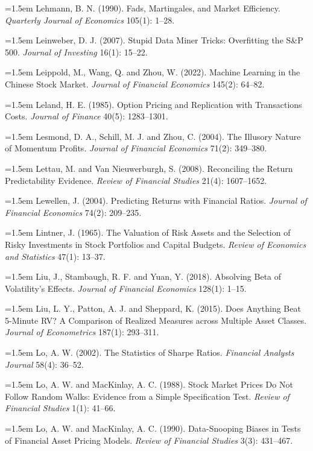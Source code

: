 \hangindent=1.5em Lehmann, B. N. (1990). Fads, Martingales, and Market Efficiency. \emph{Quarterly Journal of Economics} 105(1): 1--28.

\hangindent=1.5em Leinweber, D. J. (2007). Stupid Data Miner Tricks: Overfitting the S\&P 500. \emph{Journal of Investing} 16(1): 15--22.

\hangindent=1.5em Leippold, M., Wang, Q. and Zhou, W. (2022). Machine Learning in the Chinese Stock Market. \emph{Journal of Financial Economics} 145(2): 64--82.

\hangindent=1.5em Leland, H. E. (1985). Option Pricing and Replication with Transactions Costs. \emph{Journal of Finance} 40(5): 1283--1301.

\hangindent=1.5em Lesmond, D. A., Schill, M. J. and Zhou, C. (2004). The Illusory Nature of Momentum Profits. \emph{Journal of Financial Economics} 71(2): 349--380.

\hangindent=1.5em Lettau, M. and Van Nieuwerburgh, S. (2008). Reconciling the Return Predictability Evidence. \emph{Review of Financial Studies} 21(4): 1607--1652.

\hangindent=1.5em Lewellen, J. (2004). Predicting Returns with Financial Ratios. \emph{Journal of Financial Economics} 74(2): 209--235.

\hangindent=1.5em Lintner, J. (1965). The Valuation of Risk Assets and the Selection of Risky Investments in Stock Portfolios and Capital Budgets. \emph{Review of Economics and Statistics} 47(1): 13--37.

\hangindent=1.5em Liu, J., Stambaugh, R. F. and Yuan, Y. (2018). Absolving Beta of Volatility's Effects. \emph{Journal of Financial Economics} 128(1): 1--15.

\hangindent=1.5em Liu, L. Y., Patton, A. J. and Sheppard, K. (2015). Does Anything Beat 5-Minute RV? A Comparison of Realized Measures across Multiple Asset Classes. \emph{Journal of Econometrics} 187(1): 293--311.

\hangindent=1.5em Lo, A. W. (2002). The Statistics of Sharpe Ratios. \emph{Financial Analysts Journal} 58(4): 36--52.

\hangindent=1.5em Lo, A. W. and MacKinlay, A. C. (1988). Stock Market Prices Do Not Follow Random Walks: Evidence from a Simple Specification Test. \emph{Review of Financial Studies} 1(1): 41--66.

\hangindent=1.5em Lo, A. W. and MacKinlay, A. C. (1990). Data-Snooping Biases in Tests of Financial Asset Pricing Models. \emph{Review of Financial Studies} 3(3): 431--467.

